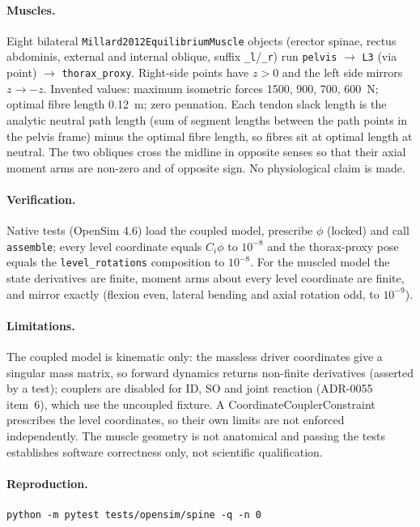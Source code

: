 \paragraph{Muscles.} Eight bilateral \texttt{Millard2012EquilibriumMuscle}
objects (erector spinae, rectus abdominis, external and internal oblique, suffix
\texttt{\_l}/\texttt{\_r}) run \texttt{pelvis} $\to$ \texttt{L3} (via point)
$\to$ \texttt{thorax\_proxy}. Right-side points have $z>0$ and the left side
mirrors $z\to -z$. Invented values: maximum isometric forces 1500, 900, 700,
600~N; optimal fibre length 0.12~m; zero pennation. Each tendon slack length is the analytic neutral path length (sum of segment lengths between the path points in the pelvis frame) minus the optimal fibre length, so fibres sit at optimal length at neutral.
The two obliques cross the midline in opposite senses so that their axial
moment arms are non-zero and of opposite sign. No physiological claim is made.

\paragraph{Verification.} Native tests (OpenSim 4.6) load the coupled model,
prescribe $\phi$ (locked) and call \texttt{assemble}; every level coordinate
equals $C_i\phi$ to $10^{-8}$ and the thorax-proxy pose equals the
\texttt{level\_rotations} composition to $10^{-8}$. For the muscled model the
state derivatives are finite, moment arms about every level coordinate are
finite, and mirror exactly (flexion even, lateral bending and axial rotation
odd, to $10^{-9}$).

\paragraph{Limitations.} The coupled model is kinematic only: the massless
driver coordinates give a singular mass matrix, so forward dynamics returns
non-finite derivatives (asserted by a test); couplers are disabled for ID, SO
and joint reaction (ADR-0055 item~6), which use the uncoupled fixture. A
CoordinateCouplerConstraint prescribes the level coordinates, so their own
limits are not enforced independently. The muscle geometry is not anatomical and
passing the tests establishes software correctness only, not scientific
qualification.

\paragraph{Reproduction.}
\begin{verbatim}
python -m pytest tests/opensim/spine -q -n 0
\end{verbatim}

